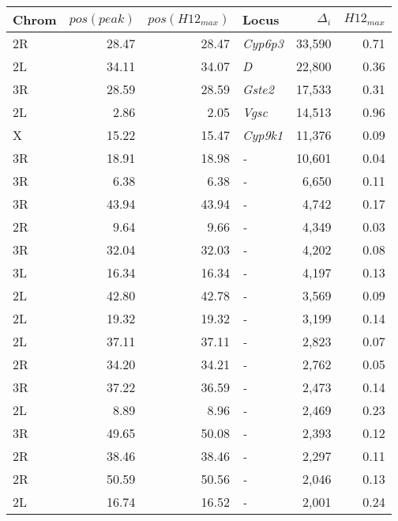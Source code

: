 \begin{tabular}{lrrlrr}
\toprule
Chrom & $pos(peak)$ & $pos(H12_{max})$ &            Locus & $\Delta_{i}$ & $H12_{max}$ \\
\midrule
   2R &       28.47 &            28.47 &  \textit{Cyp6p3} &       33,590 &        0.71 \\
   2L &       34.11 &            34.07 &       \textit{D} &       22,800 &        0.36 \\
   3R &       28.59 &            28.59 &   \textit{Gste2} &       17,533 &        0.31 \\
   2L &        2.86 &             2.05 &    \textit{Vgsc} &       14,513 &        0.96 \\
    X &       15.22 &            15.47 &  \textit{Cyp9k1} &       11,376 &        0.09 \\
   3R &       18.91 &            18.98 &       \textit{-} &       10,601 &        0.04 \\
   3R &        6.38 &             6.38 &       \textit{-} &        6,650 &        0.11 \\
   3R &       43.94 &            43.94 &       \textit{-} &        4,742 &        0.17 \\
   2R &        9.64 &             9.66 &       \textit{-} &        4,349 &        0.03 \\
   3R &       32.04 &            32.03 &       \textit{-} &        4,202 &        0.08 \\
   3L &       16.34 &            16.34 &       \textit{-} &        4,197 &        0.13 \\
   2L &       42.80 &            42.78 &       \textit{-} &        3,569 &        0.09 \\
   2L &       19.32 &            19.32 &       \textit{-} &        3,199 &        0.14 \\
   2L &       37.11 &            37.11 &       \textit{-} &        2,823 &        0.07 \\
   2R &       34.20 &            34.21 &       \textit{-} &        2,762 &        0.05 \\
   3R &       37.22 &            36.59 &       \textit{-} &        2,473 &        0.14 \\
   2L &        8.89 &             8.96 &       \textit{-} &        2,469 &        0.23 \\
   3R &       49.65 &            50.08 &       \textit{-} &        2,393 &        0.12 \\
   2R &       38.46 &            38.46 &       \textit{-} &        2,297 &        0.11 \\
   2R &       50.59 &            50.56 &       \textit{-} &        2,046 &        0.13 \\
   2L &       16.74 &            16.52 &       \textit{-} &        2,001 &        0.24 \\
\bottomrule
\end{tabular}
